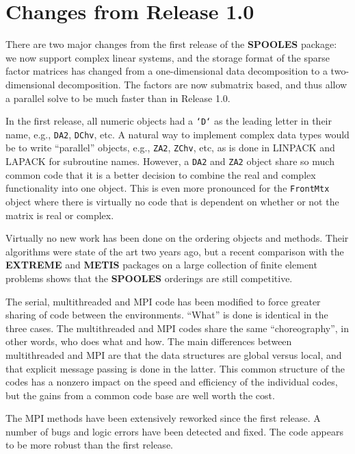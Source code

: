 \section{Changes from Release 1.0}
\label{section:intro:changes-1.0}
\par
There are two major changes from the first release of the {\bf
SPOOLES} package: we now support complex linear systems, and the
storage format of the sparse factor matrices has changed from a
one-dimensional data decomposition to a two-dimensional
decomposition. 
The factors are now submatrix based, and thus allow a parallel
solve to be much faster than in Release 1.0.
\par
In the first release, all numeric objects had a {\tt `D`} as the
leading letter in their name, e.g., {\tt DA2}, {\tt DChv}, etc.
A natural way to implement complex data types would be to write 
``parallel'' objects, e.g., {\tt ZA2}, {\tt ZChv}, etc, as is done
in LINPACK and LAPACK for subroutine names.
However, a {\tt DA2} and {\tt ZA2} object share so much common code
that it is a better decision to combine the real and complex
functionality into one object.
This is even more pronounced for the {\tt FrontMtx} object where
there is virtually no code that is dependent on whether or not the
matrix is real or complex.
\par
Virtually no new work has been done on the ordering objects and methods.
Their algorithms were state of the art two years ago, but a recent
comparison with the {\bf EXTREME} \cite{hr98-msndtalk}
and {\bf METIS} \cite{karypis98metis} packages 
on a large collection
of finite element problems shows that the {\bf SPOOLES} orderings
are still competitive.
\par
The serial, multithreaded and MPI code has been modified to force
greater sharing of code between the environments.
``What'' is done is identical in the three cases.
The multithreaded and MPI codes share the same ``choreography'',
in other words, who does what and how.
The main differences between multithreaded and MPI
are that the data structures are global versus local,
and that explicit message passing is done in the latter.
This common structure of the codes has a nonzero impact on the speed 
and efficiency of the individual codes, but the gains from a common
code base are well worth the cost.
\par
The MPI methods have been extensively reworked since the first
release. 
A number of bugs and logic errors have been detected and fixed.
The code appears to be more robust than the first release.
\par
